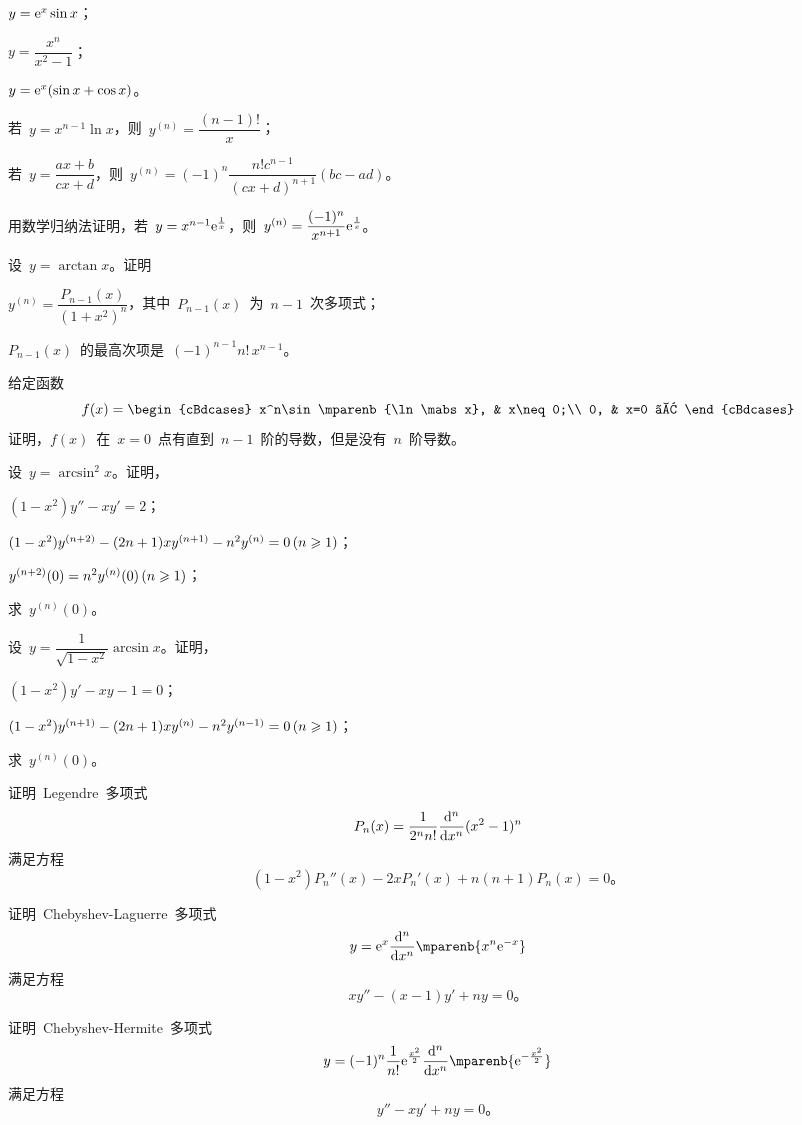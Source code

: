 \begin{exercise}
\begin{exlistcols}[3]
  \item $y=\mathrm e^x\sin x$；
  \item $y=\dfrac{x^n}{x^2-1}$；
  \item $y=\mathrm e^x(\sin x+\cos x)$。
\end{exlistcols}
\item%
\begin{exlist}\FixExHead
  \item 若~$y=x^{n-1}\ln x$，则~$y^{(n)}=\dfrac{(n-1)!}x$；
  \item 若~$y=\dfrac{ax+b}{cx+d}$，则~$y^{(n)}=(-1)^n\dfrac{n!c^{n-1}}{(cx+d)^{n+1}}(bc-ad)$。
\end{exlist}
\item 用数学归纳法证明，若~$y=x^{n-1}\mathrm e^{\frac1x}$，则~$y^{(n)}=\dfrac{(-1)^n}{x^{n+1}}\mathrm e^{\frac1x}$。
\item 设~$y=\arctan x$。证明
\begin{exlist}
  \item $y^{(n)}=\dfrac{P_{n-1}(x)}{(1+x^2)^n}$，其中~$P_{n-1}(x)$~为~$n-1$~次多项式；
  \item $P_{n-1}(x)$~的最高次项是~$(-1)^{n-1}n!\,x^{n-1}$。
\end{exlist}
\item 给定函数
\[
  f(x)=\begin{cBdcases}
    x^n\sin\mparenb{\ln\mabs x}, & x\neq0;\\
    0, & x=0 。
  \end{cBdcases}
\]
证明，$f(x)$~在~$x=0$~点有直到~$n-1$~阶的导数，但是没有~$n$~阶导数。
\item 设~$y=\arcsin^2x$。证明，
\begin{exlistcols}
  \item $(1-x^2)y''-xy'=2$；
  \item $(1-x^2)y^{(n+2)}-(2n+1)xy^{(n+1)}-n^2y^{(n)}=0\mcond{n\geq 1}$；
  \item $y^{(n+2)}(0)=n^2y^{(n)}(0)\mcond{n\geq 1}$；
  \item 求~$y^{(n)}(0)$。
\end{exlistcols}
\item 设~$y=\dfrac1{\sqrt{1-x^2}}\arcsin x$。证明，
\begin{exlistcols}
  \item $(1-x^2)y'-xy-1=0$；
  \item $(1-x^2)y^{(n+1)}-(2n+1)xy^{(n)}-n^2y^{(n-1)}=0\mcond{n\geq 1}$；
  \item 求~$y^{(n)}(0)$。
\end{exlistcols}
\item 证明~Legendre~多项式
\[
  P_n(x)=\dfrac1{2^nn!}\dfrac{\mathop{}\negthinspace\mathrm d^n}{\mathop{}\negthinspace\mathrm d x^n}(x^2-1)^n
\]
满足方程
\[
  (1-x^2)P_n''(x)-2xP_n'(x)+n(n+1)P_n(x)=0 。
\]
\item 证明~Chebyshev-Laguerre~多项式
\[
  y=\me^x\dfrac{\dif^n}{\dif x^n}\mparenb{x^n\me^{-x}}
\]
满足方程
\[
  xy''-(x-1)y'+ny=0 。
\]
\item 证明~Chebyshev-Hermite~多项式
\[
  y=(-1)^n\dfrac1{n!}\me^{\frac{x^2}2}\dfrac{\dif^n}{\dif x^n}\mparenb{\me^{-\frac{x^2}2}}
\]
满足方程
\[
  y''-xy'+ny=0 。
\]
\end{exercise}

